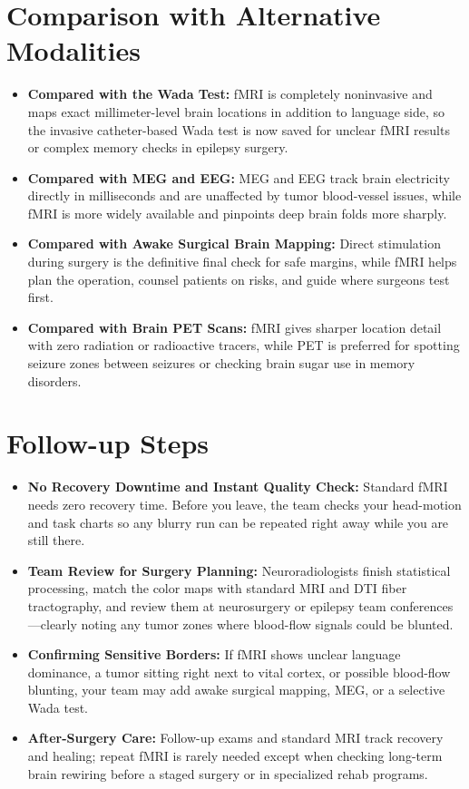 \section{Comparison with Alternative Modalities}

\begin{itemize}
    \item \textbf{Compared with the Wada Test:} fMRI is completely noninvasive and maps exact millimeter-level brain locations in addition to language side, so the invasive catheter-based Wada test is now saved for unclear fMRI results or complex memory checks in epilepsy surgery.
    \item \textbf{Compared with MEG and EEG:} MEG and EEG track brain electricity directly in milliseconds and are unaffected by tumor blood-vessel issues, while fMRI is more widely available and pinpoints deep brain folds more sharply.
    \item \textbf{Compared with Awake Surgical Brain Mapping:} Direct stimulation during surgery is the definitive final check for safe margins, while fMRI helps plan the operation, counsel patients on risks, and guide where surgeons test first.
    \item \textbf{Compared with Brain PET Scans:} fMRI gives sharper location detail with zero radiation or radioactive tracers, while PET is preferred for spotting seizure zones between seizures or checking brain sugar use in memory disorders.
\end{itemize}

\section{Follow-up Steps}

\begin{itemize}
    \item \textbf{No Recovery Downtime and Instant Quality Check:} Standard fMRI needs zero recovery time. Before you leave, the team checks your head-motion and task charts so any blurry run can be repeated right away while you are still there.
    \item \textbf{Team Review for Surgery Planning:} Neuroradiologists finish statistical processing, match the color maps with standard MRI and DTI fiber tractography, and review them at neurosurgery or epilepsy team conferences---clearly noting any tumor zones where blood-flow signals could be blunted.
    \item \textbf{Confirming Sensitive Borders:} If fMRI shows unclear language dominance, a tumor sitting right next to vital cortex, or possible blood-flow blunting, your team may add awake surgical mapping, MEG, or a selective Wada test.
    \item \textbf{After-Surgery Care:} Follow-up exams and standard MRI track recovery and healing; repeat fMRI is rarely needed except when checking long-term brain rewiring before a staged surgery or in specialized rehab programs.
\end{itemize}


